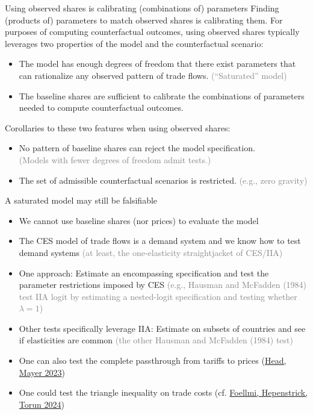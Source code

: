 \documentclass[11pt,notes=hide,aspectratio=169]{beamer}
\begin{document}
\begin{frame}{Using observed shares is calibrating (combinations of) parameters}
Finding (products of) parameters to match observed shares is calibrating them.
\medskip
For purposes of computing counterfactual outcomes, using observed shares typically leverages two properties of the model and the counterfactual scenario:
\begin{itemize}
\item
The model has enough degrees of freedom that there exist parameters that can rationalize any observed pattern of trade flows.
\textcolor{gray}{(``Saturated'' model)}
\item
The baseline shares are sufficient to calibrate the combinations of parameters needed to compute counterfactual outcomes.
\end{itemize}
\medskip
Corollaries to these two features when using observed shares:
\begin{itemize}
\item
No pattern of baseline shares can reject the model specification.\\
\textcolor{gray}{(Models with fewer degrees of freedom admit tests.)}
\item
The set of admissible counterfactual scenarios is restricted.
\textcolor{gray}{(e.g., zero gravity)}
\end{itemize}
\end{frame}
\begin{frame}{A saturated model may still be falsifiable}
\begin{itemize}
\item We cannot use baseline shares (nor prices) to evaluate the model
\item The CES model of trade flows is a demand system and we know how to test demand systems
\textcolor{gray}{(at least, the one-elasticity straightjacket of CES/IIA)}
\item One approach: Estimate an encompassing specification and test the parameter restrictions imposed by CES
\textcolor{gray}{(e.g., Hausman and McFadden (1984) test IIA logit by estimating a nested-logit specification and testing whether $\lambda = 1$)}
\item Other tests specifically leverage IIA:
Estimate on subsets of countries and see if elasticities are common
\textcolor{gray}{(the other Hausman and McFadden (1984) test)}
\item One can also test the complete passthrough from tariffs to prices (\href{https://direct.mit.edu/rest/article/doi/10.1162/rest_a_01369/117708/Poor-Substitutes-Counterfactual-Methods-in-IO-and}{Head, Mayer 2023})
\item One could test the triangle inequality on trade costs (cf. \href{https://doi.org/10.1016/j.jinteco.2024.104018}{Foellmi, Hepenstrick, Torun 2024})
\end{itemize}
\end{frame}
\end{document}
